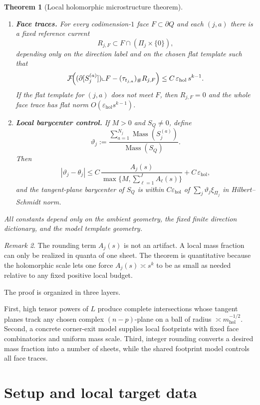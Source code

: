 \documentclass[11pt]{article}
\numberwithin{equation}{section}
\theoremstyle{plain}
\newtheorem{theorem}{Theorem}[section]
\theoremstyle{definition}
\theoremstyle{remark}
\newtheorem{remark}[theorem]{Remark}
\DeclareMathOperator{\Mass}{Mass}
\newcommand{\eps}{\varepsilon}
\newcommand{\mhol}{m_{\mathrm{hol}}}
\newcommand{\calF}{\mathcal{F}}
\begin{document}
\begin{theorem}[Local holomorphic microstructure theorem]
\begin{enumerate}
\item[\textnormal{(iv)}] \textbf{Face traces.}
For every codimension-$1$ face $F \subset \partial Q$ and each $(j,a)$ there is a fixed reference current
\[
R_{j,F}
\subset F \cap (\Pi_j \times \{0\}),
\]
depending only on the direction label and on the chosen flat template such that
\[
\calF\!\Bigl((\partial [S_j^{(a)}])\llcorner F-(\tau_{t_{j,a}})_\# R_{j,F}\Bigr)
\le C\,\eps_{\mathrm{hol}}\,s^{k-1}.
\]
If the flat template for $(j,a)$ does not meet $F$, then $R_{j,F}=0$ and the whole face trace has flat norm $O(\eps_{\mathrm{hol}}s^{k-1})$.

\item[\textnormal{(v)}] \textbf{Local barycenter control.}
If $M>0$ and $S_Q \neq 0$, define
\[
\vartheta_j := \frac{\sum_{a=1}^{N_j} \Mass(S_j^{(a)})}{\Mass(S_Q)}.
\]
Then
\[
\left|
\vartheta_j - \theta_j
\right|
\le
C\,\frac{A_j(s)}{\max\{M,\sum_{\ell=1}^J A_\ell(s)\}}
+
C\,\eps_{\mathrm{hol}},
\]
and the tangent-plane barycenter of $S_Q$ is within $C\eps_{\mathrm{hol}}$ of $\sum_j \vartheta_j \xi_{\Pi_j}$ in Hilbert--Schmidt norm.
\end{enumerate}

All constants depend only on the ambient geometry, the fixed finite direction dictionary, and the model template geometry.
\end{theorem}

\begin{remark}
The rounding term $A_j(s)$ is not an artifact.  A local mass fraction can only be realized in quanta of one sheet.  The theorem is quantitative because the holomorphic scale lets one force $A_j(s) \asymp s^k$ to be as small as needed relative to any fixed positive local budget.
\end{remark}

The proof is organized in three layers.

First, high tensor powers of $L$ produce complete intersections whose tangent planes track any chosen complex $(n-p)$-plane on a ball of radius $\asymp \mhol^{-1/2}$.  Second, a concrete corner-exit model supplies local footprints with fixed face combinatorics and uniform mass scale.  Third, integer rounding converts a desired mass fraction into a number of sheets, while the shared footprint model controls all face traces.

\section{Setup and local target data}
\end{document}

